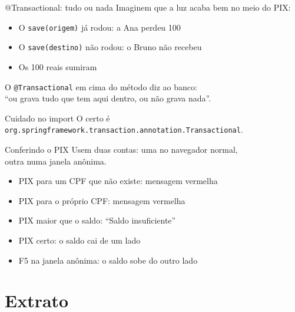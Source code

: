\documentclass[aspectratio=169,11pt]{beamer}
\begin{document}
\begin{frame}{@Transactional: tudo ou nada}
  Imaginem que a luz acaba bem no meio do PIX:

  \vspace{0.4em}
  \begin{itemize}
    \item O \texttt{save(origem)} já rodou: a Ana perdeu 100
    \item O \texttt{save(destino)} não rodou: o Bruno não recebeu
    \item Os 100 reais sumiram
  \end{itemize}

  \vspace{0.5em}
  O \texttt{@Transactional} em cima do método diz ao banco:\\
  ``ou grava tudo que tem aqui dentro, ou não grava nada''.

  \vspace{0.5em}
  \begin{alertblock}{Cuidado no import}
    O certo é \texttt{org.springframework.transaction.annotation.Transactional}.
  \end{alertblock}
\end{frame}

\begin{frame}{Conferindo o PIX}
  Usem duas contas: uma no navegador normal,\\
  outra numa janela anônima.

  \vspace{0.5em}
  \begin{itemize}
    \item [ ] PIX para um CPF que não existe: mensagem vermelha
    \item [ ] PIX para o próprio CPF: mensagem vermelha
    \item [ ] PIX maior que o saldo: ``Saldo insuficiente''
    \item [ ] PIX certo: o saldo cai de um lado
    \item [ ] F5 na janela anônima: o saldo sobe do outro lado
  \end{itemize}
\end{frame}

\section{Extrato}
\end{document}

